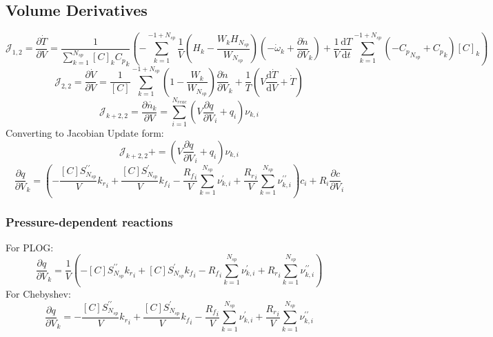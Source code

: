 \documentclass[a4paper,10pt]{article}
\newcommand{\pluseq}{\mathrel{{+}{=}}}
\newcommand{\ns}{N_{sp}}
\newcommand{\nr}{N_{reac}}
\begin{document}
\subsection{Volume Derivatives}
\begin{dmath} \mathcal{J}_{1,2} = \frac{\partial\dot{T}}{\partial{V}} = \frac{1}{\sum_{k=1}^{\ns} [C]_{k} {C_p}_{k}} \left(- \sum_{k=1}^{-1 + \ns} \frac{1}{V} \left(H_{k} - \frac{W_{k} H_{\ns}}{W_{\ns}}\right) \left(- \dot{\omega}_{k} + \frac{\partial \dot{n} }{\partial V }_{k}\right) + \frac{1}{V} \frac{\text{d} T }{\text{d} t } \sum_{k=1}^{-1 + \ns} \left(- {C_p}_{\ns} + {C_p}_{k}\right) [C]_{k}\right)\end{dmath} 
\begin{dmath} \mathcal{J}_{2,2} = \frac{\partial \dot{ V } }{\partial V } = \frac{1}{[C]} \sum_{k=1}^{-1 + \ns} \left(1 - \frac{W_{k}}{W_{\ns}}\right) \frac{\partial \dot{n} }{\partial V }_{k} + \frac{1}{T} \left(V \frac{\text{d} \dot{T} }{\text{d} V } + \dot{T}\right)\end{dmath} 
\begin{dmath} \mathcal{J}_{k + 2,2} = \frac{\partial \dot{n_k} }{\partial V } = \sum_{i=1}^{\nr} \left(V \frac{\partial q }{\partial V }_{i} + q_{i}\right) \nu_{k,i}\end{dmath} 
Converting to Jacobian Update form:
\begin{dmath} \mathcal{J}_{k + 2,2}\pluseq \left(V \frac{\partial q }{\partial V }_{i} + q_{i}\right) \nu_{k,i}\end{dmath} 
\begin{dmath} \frac{\partial q }{\partial V }_{k} = \left(- \frac{[C] S^{\prime\prime}_{\ns}}{V} {k_r}_{i} + \frac{[C] S^{\prime}_{\ns}}{V} {k_f}_{i} - \frac{{R_f}_{i}}{V} \sum_{k=1}^{\ns} \nu^{\prime}_{k,i} + \frac{{R_r}_{i}}{V} \sum_{k=1}^{\ns} \nu^{\prime\prime}_{k,i}\right) c_{i} + R_{i} \frac{\partial c }{\partial V }_{i}\end{dmath} 
\subsubsection{Pressure-dependent reactions}
For PLOG:
\begin{dmath} \frac{\partial q }{\partial V }_{k} = \frac{1}{V} \left(- [C] S^{\prime\prime}_{\ns} {k_r}_{i} + [C] S^{\prime}_{\ns} {k_f}_{i} - {R_f}_{i} \sum_{k=1}^{\ns} \nu^{\prime}_{k,i} + {R_r}_{i} \sum_{k=1}^{\ns} \nu^{\prime\prime}_{k,i}\right)\end{dmath} 
For Chebyshev:
\begin{dmath} \frac{\partial q }{\partial V }_{k} = - \frac{[C] S^{\prime\prime}_{\ns}}{V} {k_r}_{i} + \frac{[C] S^{\prime}_{\ns}}{V} {k_f}_{i} - \frac{{R_f}_{i}}{V} \sum_{k=1}^{\ns} \nu^{\prime}_{k,i} + \frac{{R_r}_{i}}{V} \sum_{k=1}^{\ns} \nu^{\prime\prime}_{k,i}\end{dmath} 
\end{document}
